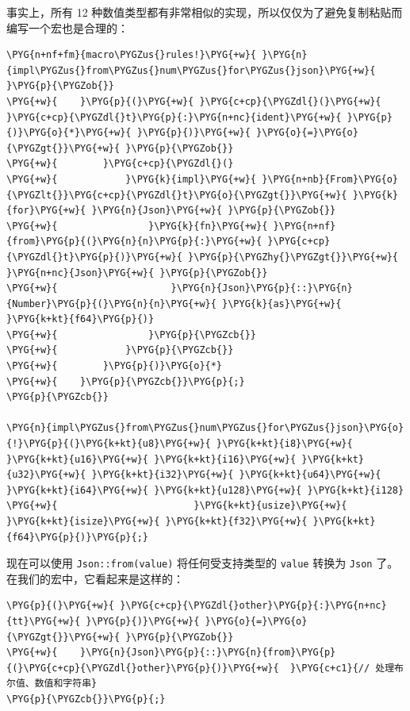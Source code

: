 事实上，所有 12 种数值类型都有非常相似的实现，所以仅仅为了避免复制粘贴而编写一个宏也是合理的：

\begin{Verbatim}[commandchars=\\\{\},breaklines=true,breakanywhere=true,fontsize=\codefont,xleftmargin=17bp]
\PYG{n+nf+fm}{macro\PYGZus{}rules!}\PYG{+w}{ }\PYG{n}{impl\PYGZus{}from\PYGZus{}num\PYGZus{}for\PYGZus{}json}\PYG{+w}{ }\PYG{p}{\PYGZob{}}
\PYG{+w}{    }\PYG{p}{(}\PYG{+w}{ }\PYG{c+cp}{\PYGZdl{}(}\PYG{+w}{ }\PYG{c+cp}{\PYGZdl{}t}\PYG{p}{:}\PYG{n+nc}{ident}\PYG{+w}{ }\PYG{p}{)}\PYG{o}{*}\PYG{+w}{ }\PYG{p}{)}\PYG{+w}{ }\PYG{o}{=}\PYG{o}{\PYGZgt{}}\PYG{+w}{ }\PYG{p}{\PYGZob{}}
\PYG{+w}{        }\PYG{c+cp}{\PYGZdl{}(}
\PYG{+w}{            }\PYG{k}{impl}\PYG{+w}{ }\PYG{n+nb}{From}\PYG{o}{\PYGZlt{}}\PYG{c+cp}{\PYGZdl{}t}\PYG{o}{\PYGZgt{}}\PYG{+w}{ }\PYG{k}{for}\PYG{+w}{ }\PYG{n}{Json}\PYG{+w}{ }\PYG{p}{\PYGZob{}}
\PYG{+w}{                }\PYG{k}{fn}\PYG{+w}{ }\PYG{n+nf}{from}\PYG{p}{(}\PYG{n}{n}\PYG{p}{:}\PYG{+w}{ }\PYG{c+cp}{\PYGZdl{}t}\PYG{p}{)}\PYG{+w}{ }\PYG{p}{\PYGZhy{}\PYGZgt{}}\PYG{+w}{ }\PYG{n+nc}{Json}\PYG{+w}{ }\PYG{p}{\PYGZob{}}
\PYG{+w}{                    }\PYG{n}{Json}\PYG{p}{::}\PYG{n}{Number}\PYG{p}{(}\PYG{n}{n}\PYG{+w}{ }\PYG{k}{as}\PYG{+w}{ }\PYG{k+kt}{f64}\PYG{p}{)}
\PYG{+w}{                }\PYG{p}{\PYGZcb{}}
\PYG{+w}{            }\PYG{p}{\PYGZcb{}}
\PYG{+w}{        }\PYG{p}{)}\PYG{o}{*}
\PYG{+w}{    }\PYG{p}{\PYGZcb{}}\PYG{p}{;}
\PYG{p}{\PYGZcb{}}

\PYG{n}{impl\PYGZus{}from\PYGZus{}num\PYGZus{}for\PYGZus{}json}\PYG{o}{!}\PYG{p}{(}\PYG{k+kt}{u8}\PYG{+w}{ }\PYG{k+kt}{i8}\PYG{+w}{ }\PYG{k+kt}{u16}\PYG{+w}{ }\PYG{k+kt}{i16}\PYG{+w}{ }\PYG{k+kt}{u32}\PYG{+w}{ }\PYG{k+kt}{i32}\PYG{+w}{ }\PYG{k+kt}{u64}\PYG{+w}{ }\PYG{k+kt}{i64}\PYG{+w}{ }\PYG{k+kt}{u128}\PYG{+w}{ }\PYG{k+kt}{i128}
\PYG{+w}{                        }\PYG{k+kt}{usize}\PYG{+w}{ }\PYG{k+kt}{isize}\PYG{+w}{ }\PYG{k+kt}{f32}\PYG{+w}{ }\PYG{k+kt}{f64}\PYG{p}{)}\PYG{p}{;}
\end{Verbatim}

现在可以使用 \texttt{Json::from(value)} 将任何受支持类型的 \texttt{value} 转换为 \texttt{Json} 了。在我们的宏中，它看起来是这样的：

\begin{Verbatim}[commandchars=\\\{\},breaklines=true,breakanywhere=true,fontsize=\codefont,xleftmargin=17bp]
\PYG{p}{(}\PYG{+w}{ }\PYG{c+cp}{\PYGZdl{}other}\PYG{p}{:}\PYG{n+nc}{tt}\PYG{+w}{ }\PYG{p}{)}\PYG{+w}{ }\PYG{o}{=}\PYG{o}{\PYGZgt{}}\PYG{+w}{ }\PYG{p}{\PYGZob{}}
\PYG{+w}{    }\PYG{n}{Json}\PYG{p}{::}\PYG{n}{from}\PYG{p}{(}\PYG{c+cp}{\PYGZdl{}other}\PYG{p}{)}\PYG{+w}{  }\PYG{c+c1}{// 处理布尔值、数值和字符串}
\PYG{p}{\PYGZcb{}}\PYG{p}{;}
\end{Verbatim}


